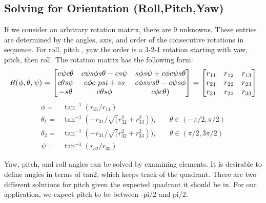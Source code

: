 \documentclass[a4paper]{article}
\begin{document}
\subsection{Solving for Orientation (Roll,Pitch,Yaw)}
If we consider an arbitrary rotation matrix, there are 9 unknowns. These entries are determined by the angles, axis, and order of the consecutive rotations in sequence. For roll, pitch , yaw the order is a 3-2-1 rotation starting with yaw, pitch, then roll. The rotation matrix has the following form:
\begin{equation}
\resizebox{\linewidth}{!}{$
R(\phi,\theta,\psi) = \begin{bmatrix}
c \psi c \theta & c \psi s \phi s \theta - c s \psi & s \phi s \psi + c \phi c \psi s \theta \\
c \theta s \psi & c \phi c\ psi + s s & c \phi s \psi s \theta - c \psi s \phi \\ 
-s \theta & c \theta s \phi & c \phi c \theta)
\end{bmatrix} = \begin{bmatrix}
r_{11} & r_{12} & r_{13}\\
r_{21} & r_{22} & r_{23}\\
r_{31} & r_{32} & r_{33}
\end{bmatrix} $}
\end{equation}
\begin{equation}
\begin{aligned}
\phi=&\tan^{-1}(r_{21}/r_{11} ) &\\
\theta_1=&\tan^{-1}(-r_{31}/\sqrt(r_{32}^2+r_{33}^2 )), & \quad \theta \in(-\pi/2,\pi/2) \\
\theta_2=&\tan^{-1}(-r_{31}/\sqrt(r_{32}^2+r_{33}^2 )), & \quad \theta \in (\pi/2,3\pi/2) \\
\psi=&\tan^{-1}(r_{32}/r_{33} ) &
\end{aligned}
\end{equation}

Yaw, pitch, and roll angles can be solved by examining elements. It is desirable to define angles in terms of tan2, which keeps track of the quadrant. There are two different solutions for pitch given the expected quadrant it should be in. For our application, we expect pitch to be between -pi/2 and pi/2.
\end{document}
